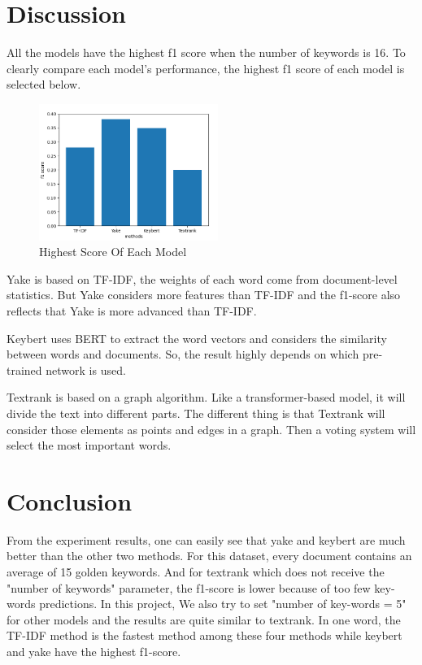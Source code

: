\documentclass[11pt]{article}
\begin{document}
  \section{Discussion}
  All the models have the highest f1 score when the number of keywords is 16. To clearly compare each model's performance, the highest f1 score of each model is selected below.
  \begin{figure}[H] %
\centering %
\includegraphics[width=0.52\textwidth]{pic/p1.png} %
\caption{Highest Score Of Each Model} %
\label{Fig.main2} %
\end{figure}

    \vspace{11pt}
  \noindent
  Yake is based on TF-IDF, the weights of each word come from document-level statistics. But Yake considers more features than TF-IDF and the f1-score also reflects that Yake is more advanced than TF-IDF.
  
  \vspace{11pt}
  \noindent
  Keybert uses BERT to extract the word vectors and considers the similarity between words and documents. So, the result highly depends on which pre-trained network is used. 
  
  \vspace{11pt}
  \noindent
  Textrank is based on a graph algorithm. Like a transformer-based model, it will divide the text into different parts. The different
  thing is that Textrank will consider those elements as points and edges in a graph. Then a voting system will
  select the most important words.

  
  \section{Conclusion}
  From the experiment results, one can easily see that yake and keybert are much better than the other two methods. For this 
  dataset, every document contains an average of 15 golden keywords. And for textrank which does not receive the "number of keywords" parameter,
  the f1-score is lower because of too few key-words predictions. In this project, We also try to set "number of key-words = 5" for other
  models and the results are quite similar to textrank. In one word, the TF-IDF method is the fastest method among these four methods while keybert and yake have the highest f1-score.
  
\end{document}
